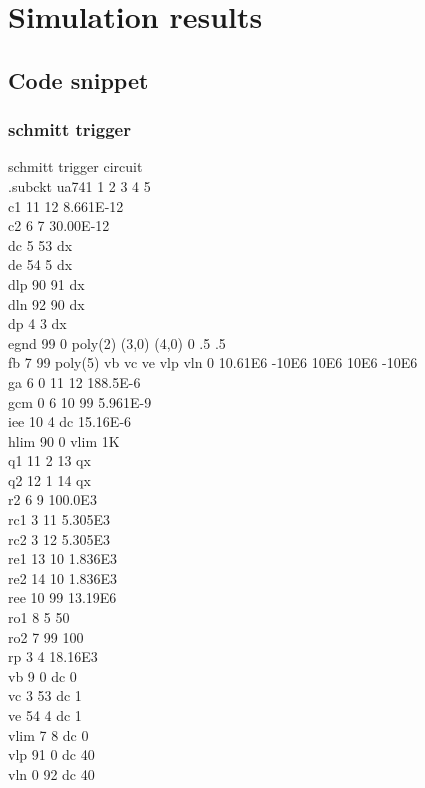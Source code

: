 \documentclass[12pt]{article}
\begin{document}
 
\section{Simulation results}%
\subsection{Code snippet}

\subsubsection{schmitt trigger}
schmitt trigger circuit\\
.subckt ua741    1  2  3  4  5\\
c1   11 12 8.661E-12\\
c2    6  7 30.00E-12\\
dc    5 53 dx\\
de   54  5 dx\\
dlp  90 91 dx\\
dln  92 90 dx\\
dp    4  3 dx\\
egnd 99  0 poly(2) (3,0) (4,0) 0 .5 .5\\
fb    7 99 poly(5) vb vc ve vlp vln 0 10.61E6 -10E6 10E6 10E6 -10E6\\
ga    6  0 11 12 188.5E-6\\
gcm   0  6 10 99 5.961E-9\\
iee  10  4 dc 15.16E-6\\
hlim 90  0 vlim 1K\\
q1   11  2 13 qx\\
q2   12  1 14 qx\\
r2    6  9 100.0E3\\
rc1   3 11 5.305E3\\
rc2   3 12 5.305E3\\
re1  13 10 1.836E3\\
re2  14 10 1.836E3\\
ree  10 99 13.19E6\\
ro1   8  5 50\\
ro2   7 99 100\\
rp    3  4 18.16E3\\
vb    9  0 dc 0\\
vc    3 53 dc 1\\
ve   54  4 dc 1\\
vlim  7  8 dc 0\\
vlp  91  0 dc 40\\
vln   0 92 dc 40\\
\end{document}
